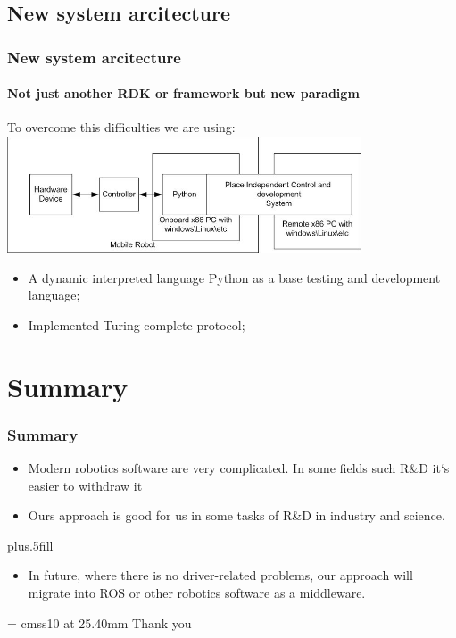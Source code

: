 \documentclass{beamer}
\begin{document}
\subsection{New system arcitecture}
\begin{frame}
\frametitle{New system arcitecture}
\framesubtitle{Not just another RDK or framework but new paradigm}

To overcome this difficulties we are using:
\includegraphics[width=10.5cm]{rpc1.jpg}
\begin{itemize}
 \item<1>A dynamic interpreted language Python as a base testing and development language;
 \item<1>Implemented Turing-complete protocol;
\end{itemize}
\end{frame}


\section*{Summary}

\begin{frame}
\frametitle<presentation>{Summary}

\begin{itemize}
  \item<1> Modern robotics software are very complicated. In some fields such
  R\&D it`s easier to withdraw it
  \item<1> Ours approach is good for us in some tasks of R\&D in industry and
  science.
\end{itemize}

\vskip0pt plus.5fill

\begin{itemize}
  \item<1> In future, where there is no driver-related problems, our approach
  will migrate into ROS or other robotics software as a middleware.
\end{itemize}
\end{frame}


\begin{frame}
      \begin{center}
        \font\endfont = cmss10 at 25.40mm
        \endfont 
        \baselineskip 20.0mm
        Thank you
      \end{center}    
\end{frame}
\end{document}
